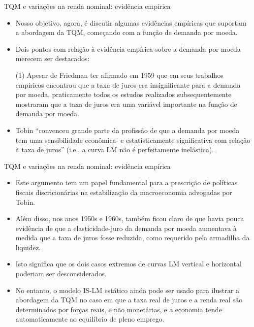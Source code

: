 \documentclass[10pt]{beamer}
\begin{document}
\begin{frame}{TQM e variações na renda nominal: evidência empírica}
    \begin{itemize}
        \item Nosso objetivo, agora, é discutir algumas evidências empíricas que suportam a abordagem da TQM, começando com a função de demanda por moeda.
        \bigskip
        \item Dois pontos com relação à evidência empírica sobre a demanda por moeda merecem ser destacados:
        \bigskip
        \item[(1)] Apesar de Friedman ter afirmado em 1959 que em seus trabalhos empíricos encontrou que a taxa de juros era insignificante para a demanda por moeda, praticamente todos os estudos realizados subsequentemente mostraram que a taxa de juros era uma variável importante na função de demanda por moeda.
        \bigskip
        \item Tobin ``convenceu grande parte da profissão de que a demanda por moeda tem uma sensibilidade econômica- e estatisticamente significativa com relação à taxa de juros'' (i.e., a curva LM não é perfeitamente inelástica).
    \end{itemize}
\end{frame}

\begin{frame}{TQM e variações na renda nominal: evidência empírica}
    \begin{itemize}
        \item Este argumento tem um papel fundamental para a prescrição de políticas fiscais discricionárias na estabilização da macroeconomia advogadas por Tobin.
        \bigskip
        \item Além disso, nos anos 1950s e 1960s, também ficou claro de que havia pouca evidência de que a elasticidade-juro da demanda por moeda aumentava à medida que a taxa de juros fosse reduzida, como requerido pela armadilha da liquidez.
        \bigskip
        \item Isto significa que os dois casos extremos de curvas LM vertical e horizontal poderiam ser desconsiderados.
        \bigskip
        \item No entanto, o modelo IS-LM estático ainda pode ser usado para ilustrar a abordagem da TQM no caso em que a taxa real de juros e a renda real são determinados por forças reais, e não monetárias, e a economia tende automaticamente ao equilíbrio de pleno emprego.
    \end{itemize}
\end{frame}
\end{document}
